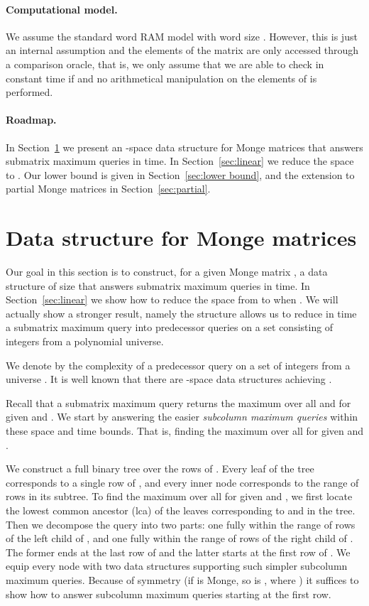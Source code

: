 \documentclass{llncs}
\begin{document}
\paragraph{\bf Computational model.}
We assume the standard word RAM model with word size . However,
this is just an internal assumption and the elements of the matrix  are only accessed
through a comparison oracle, that is, we only assume that we are able to check in constant
time if  and no arithmetical manipulation on the elements of  is 
performed.

\paragraph{\bf Roadmap.}
In Section~\ref{sec:structure} we present an -space data structure for Monge matrices that answers submatrix maximum queries in  time. In Section~\ref{sec:linear} we reduce the space to . Our lower bound is given in Section~\ref{sec:lower bound}, and the extension to partial Monge matrices in Section~\ref{sec:partial}.


\section{Data structure for Monge matrices}
\label{sec:structure}
Our goal in this section is to construct, for a given   Monge matrix , a data structure
of size  that answers submatrix maximum queries in  time. In Section~\ref{sec:linear}
we show how to reduce the space from  to  when .
We will actually show a stronger result, namely the structure allows us to reduce in  time
a submatrix maximum query into  predecessor queries on a set consisting of  integers from
a polynomial universe.

We denote by  the complexity of a predecessor query on a set of  integers from
a universe . It is well known
that there are -space data structures achieving .

Recall
that a submatrix maximum query returns the maximum  over all  and
 for given  and . We start by answering the easier 
 \emph{subcolumn maximum queries} within these space and time bounds. 
That is,  finding the maximum  over all  for given
 and .

We construct a full binary tree  over the rows of . Every leaf of the tree corresponds to a single row
of , and every inner node corresponds to the range of rows in its subtree. To find the maximum  over all
 for  given  and , we first
locate the lowest common ancestor (lca)  of the leaves
corresponding to  and  in the tree. Then we decompose the query into two parts:
one fully within the range of rows  of the left child of , and one fully within
the range of rows  of the right child of . The former ends at the last row of 
and the latter starts at the first row of . We equip every node with two data structures
supporting  such simpler subcolumn maximum queries. Because of symmetry (if  is
Monge, so is , where ) it suffices to show how to answer
subcolumn maximum queries starting at the first row. 
\end{document}
